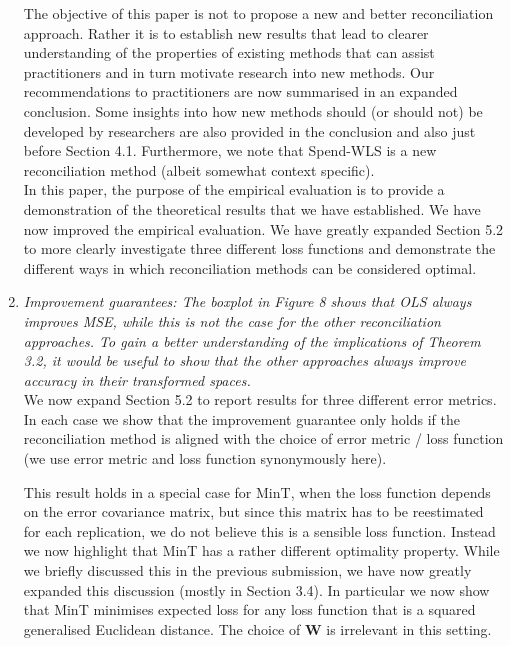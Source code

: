 \documentclass[a4paper,11pt]{article}
\begin{document}
\begin{enumerate}
        The objective of this paper is not to propose a new and better reconciliation approach.  Rather it is to establish new results that lead to clearer understanding of the properties of existing methods that can assist practitioners and in turn motivate research into new methods.  Our recommendations to practitioners are now summarised in an expanded conclusion.  Some insights into how new methods should (or should not) be developed by researchers are also provided in the conclusion and also just before Section 4.1.  Furthermore, we note that Spend-WLS is a new reconciliation method (albeit somewhat context specific).  \\
		
        In this paper, the purpose of the empirical evaluation is to provide a demonstration of the theoretical results that we have established.  We have now improved the empirical evaluation.  We have greatly expanded Section 5.2 to more clearly investigate three different loss functions and demonstrate the different ways in which reconciliation methods can be considered optimal.\\

		
		\item \textit{Improvement guarantees: The boxplot in Figure 8 shows that OLS always improves MSE, while this is not the case for the other reconciliation approaches. To gain a better understanding of the implications of Theorem 3.2, it would be useful to show that the other approaches always
		improve accuracy in their transformed spaces.}\\
	
	    We now expand Section 5.2 to report results for three different error metrics.  In each case we show that the improvement guarantee only holds if the reconciliation method is aligned with the choice of error metric / loss function (we use error metric and loss function synonymously here).
	
	    This result holds in a special case for MinT, when the loss function depends on the error covariance matrix, but since this matrix has to be reestimated for each replication, we do not believe this is a sensible loss function.  Instead we now highlight that MinT has a rather different optimality property.  While we briefly discussed this in the previous submission, we have now greatly expanded this discussion (mostly in Section 3.4).  In particular we now show that MinT minimises expected loss for any loss function that is a squared generalised Euclidean distance.  The choice of $\bm{W}$ is irrelevant in this setting.\\
		

\end{enumerate}
\end{document}
